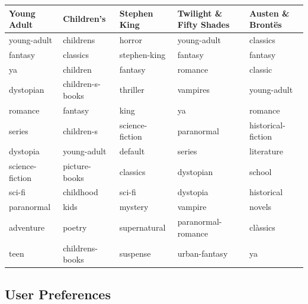 \documentclass[handout]{beamer}
\begin{document}
\begin{frame}
\begin{table}
\centering
\begin{tabular}{HHHll}
\toprule
     Young Adult &        Children's &     Stephen King & Twilight \& Fifty Shades &    Austen \& Bront\"es \\
\midrule
     young-adult &         childrens &           horror &             young-adult &            classics \\
         fantasy &          classics &     stephen-king &                 fantasy &             fantasy \\
              ya &          children &          fantasy &                 romance &             classic \\
       dystopian &  children-s-books &         thriller &                vampires &         young-adult \\
         romance &           fantasy &             king &                      ya &             romance \\
          series &        children-s &  science-fiction &              paranormal &  historical-fiction \\
        dystopia &       young-adult &          default &                  series &          literature \\
 science-fiction &     picture-books &         classics &               dystopian &              school \\
          sci-fi &         childhood &           sci-fi &                dystopia &          historical \\
      paranormal &              kids &          mystery &                 vampire &              novels \\
       adventure &            poetry &     supernatural &      paranormal-romance &            cl\`assics \\
            teen &   childrens-books &         suspense &           urban-fantasy &                  ya \\
\bottomrule
\end{tabular}
\end{table}
\end{frame}



\subsection{User Preferences}
\end{document}
